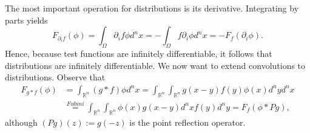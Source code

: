 \documentclass[A4,12pt,twoside]{book}
\begin{document}
The most important operation for distributions is its derivative. Integrating by parts yields
$$
F_{\partial_i f}(\phi) = \int_\Omega \partial_i f \phi d^n x= - \int_\Omega f\partial_i\phi d^n x=- F_f (\partial_i \phi).
$$
Hence, because test functions are infinitely differentiable, it follows that distributions are infinitely differentiable.
We now want to extend convolutions to distributions. Observe that
\begin{align*}
F_{g *f} (\phi) &= \int_{\mathbb{R}^n} (g *f) \phi d^n x = \int_{\mathbb{R}^n} \int_{\mathbb{R}^n} g(x-y) f(y) \phi(x) d^n y d^nx \\
&\stackrel{Fubini}{=} \int_{\mathbb{R}^n} \int_{\mathbb{R}^n} \phi(x) g(x-y) d^n x f(y) d^ny= F_f (\phi*Pg),
\end{align*}
although $(Pg)(z) := g(-z)$ is the point reflection operator.
\end{document}
